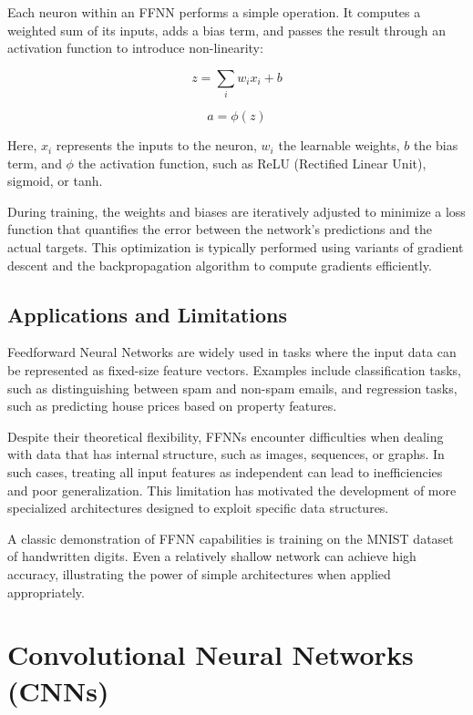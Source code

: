 \documentclass[openany]{book}
\begin{document}
Each neuron within an FFNN performs a simple operation. It computes a weighted 
sum of its inputs, adds a bias term, and passes the result through an activation 
function to introduce non-linearity:

\begin{equation}
z = \sum_{i} w_i x_i + b
\end{equation}

\begin{equation}
a = \phi(z)
\end{equation}

Here, $x_i$ represents the inputs to the neuron, $w_i$ the learnable weights, 
$b$ the bias term, and $\phi$ the activation function, such as ReLU (Rectified 
Linear Unit), sigmoid, or tanh.

During training, the weights and biases are iteratively adjusted to minimize a 
loss function that quantifies the error between the network's predictions and 
the actual targets. This optimization is typically performed using variants of 
gradient descent and the backpropagation algorithm to compute gradients 
efficiently.

\subsection{Applications and Limitations}

Feedforward Neural Networks are widely used in tasks where the input data can be 
represented as fixed-size feature vectors. Examples include classification 
tasks, such as distinguishing between spam and non-spam emails, and regression 
tasks, such as predicting house prices based on property features.

Despite their theoretical flexibility, FFNNs encounter difficulties when dealing 
with data that has internal structure, such as images, sequences, or graphs. In 
such cases, treating all input features as independent can lead to 
inefficiencies and poor generalization. This limitation has motivated the 
development of more specialized architectures designed to exploit specific data 
structures.

A classic demonstration of FFNN capabilities is training on the MNIST dataset of 
handwritten digits. Even a relatively shallow network can achieve high accuracy, 
illustrating the power of simple architectures when applied appropriately.

\section{Convolutional Neural Networks (CNNs)}
\end{document}
